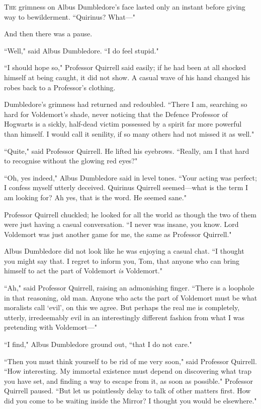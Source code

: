 
\lettrine{T}{he} grimness on Albus Dumbledore's face lasted only an instant before giving way to bewilderment. ``Quirinus? What—"

And then there was a pause.

``Well," said Albus Dumbledore. ``I do feel stupid."

``I should hope so," Professor Quirrell said easily; if he had been at all shocked himself at being caught, it did not show. A casual wave of his hand changed his robes back to a Professor's clothing.

Dumbledore's grimness had returned and redoubled. ``There I am, searching so hard for Voldemort's shade, never noticing that the Defence Professor of Hogwarts is a sickly, half-dead victim possessed by a spirit far more powerful than himself. I would call it senility, if so many others had not missed it as well."

``Quite," said Professor Quirrell. He lifted his eyebrows. ``Really, am I that hard to recognise without the glowing red eyes?"

``Oh, yes indeed," Albus Dumbledore said in level tones. ``Your acting was perfect; I confess myself utterly deceived. Quirinus Quirrell seemed—what is the term I am looking for? Ah yes, that is the word. He seemed sane."

Professor Quirrell chuckled; he looked for all the world as though the two of them were just having a casual conversation. ``I never was insane, you know. Lord Voldemort was just another game for me, the same as Professor Quirrell."

Albus Dumbledore did not look like he was enjoying a casual chat. ``I thought you might say that. I regret to inform you, Tom, that anyone who can bring himself to act the part of Voldemort \emph{is} Voldemort."

``Ah," said Professor Quirrell, raising an admonishing finger. ``There is a loophole in that reasoning, old man. Anyone who acts the part of Voldemort must be what moralists call `evil', on this we agree. But perhaps the real me is completely, utterly, irredeemably evil in an interestingly different fashion from what I was pretending with Voldemort—"

``I find," Albus Dumbledore ground out, ``that I do not care."

``Then you must think yourself to be rid of me very soon," said Professor Quirrell. ``How interesting. My immortal existence must depend on discovering what trap you have set, and finding a way to escape from it, as soon as possible." Professor Quirrell paused. ``But let us pointlessly delay to talk of other matters first. How did you come to be waiting inside the Mirror? I thought you would be elsewhere."


